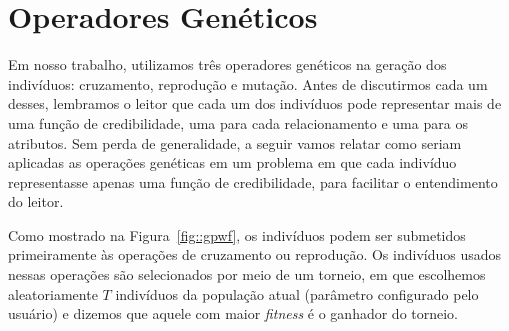 

\section{Operadores Genéticos}
\label{subsec::operadoresgeneticos}

Em nosso trabalho, utilizamos três operadores genéticos na geração dos indivíduos: cruzamento, reprodução e mutação.
Antes de discutirmos cada um desses, lembramos o leitor que cada um dos indivíduos pode representar mais de uma função de credibilidade, uma para cada relacionamento e uma para os atributos. Sem perda de generalidade, a seguir vamos relatar como seriam aplicadas as operações genéticas em um problema em que cada indivíduo representasse apenas uma função de credibilidade, para facilitar o entendimento do leitor.

Como mostrado na Figura~\ref{fig::gpwf}, os indivíduos podem ser submetidos primeiramente às operações de cruzamento ou reprodução. 
Os indivíduos usados nessas operações são selecionados por meio de um torneio, em que escolhemos aleatoriamente $T$ indivíduos da população atual (parâmetro configurado pelo usuário) e dizemos que aquele com maior \textit{fitness} é o ganhador do torneio. 

